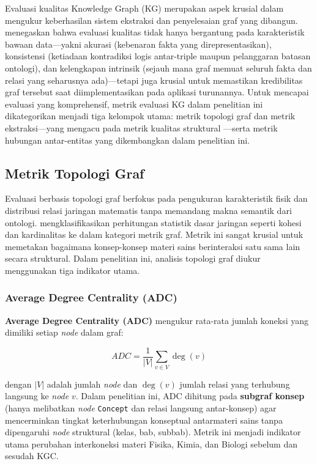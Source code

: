 \documentclass[main]{subfiles}
\begin{document}
Evaluasi kualitas Knowledge Graph (KG) merupakan aspek krusial dalam
mengukur keberhasilan sistem ekstraksi dan penyelesaian graf yang
dibangun. \textcite{xue_knowledge_2022} menegaskan bahwa evaluasi kualitas tidak
hanya bergantung pada karakteristik bawaan data---yakni akurasi
(kebenaran fakta yang direpresentasikan), konsistensi (ketiadaan
kontradiksi logis antar-triple maupun pelanggaran batasan ontologi), dan
kelengkapan intrinsik (sejauh mana graf memuat seluruh fakta dan relasi
yang seharusnya ada)---tetapi juga krusial untuk
memastikan kredibilitas graf tersebut saat diimplementasikan pada
aplikasi turunannya. Untuk mencapai evaluasi yang komprehensif, metrik
evaluasi KG dalam penelitian ini dikategorikan menjadi tiga kelompok
utama: metrik topologi graf dan metrik ekstraksi---yang mengacu pada metrik kualitas 
struktural \parencite{seo_structural_2022}---serta metrik hubungan antar-entitas yang 
dikembangkan dalam penelitian ini.

\subsection{Metrik Topologi Graf}
\label{subsec:metrik-topologi}

Evaluasi berbasis topologi graf berfokus pada pengukuran karakteristik
fisik dan distribusi relasi jaringan matematis tanpa memandang makna
semantik dari ontologi. \textcite{seo_structural_2022} mengklasifikasikan
perhitungan statistik dasar jaringan seperti kohesi dan kardinalitas ke
dalam kategori metrik graf. Metrik ini sangat krusial untuk memetakan
bagaimana konsep-konsep materi sains berinteraksi satu sama lain secara
struktural. Dalam penelitian ini, analisis topologi graf diukur
menggunakan tiga indikator utama.

\subsubsection{Average Degree Centrality (ADC)}

\textbf{Average Degree Centrality (ADC)} mengukur rata-rata jumlah koneksi
yang dimiliki setiap \textit{node} dalam graf:

\[
  ADC = \frac{1}{|V|} \sum_{v \in V} \deg(v)
\]

\noindent dengan $|V|$ adalah jumlah \textit{node} dan $\deg(v)$ jumlah relasi
yang terhubung langsung ke \textit{node} $v$. Dalam penelitian ini, ADC dihitung
pada \textbf{subgraf konsep} (hanya melibatkan \textit{node} \texttt{Concept}
dan relasi langsung antar-konsep) agar mencerminkan tingkat keterhubungan
konseptual antarmateri sains tanpa dipengaruhi \textit{node} struktural (kelas,
bab, subbab). Metrik ini menjadi indikator utama perubahan interkoneksi materi
Fisika, Kimia, dan Biologi sebelum dan sesudah KGC.
\end{document}
